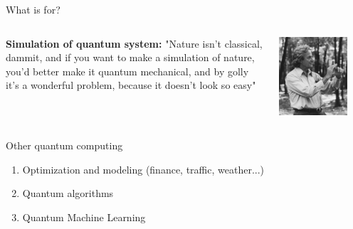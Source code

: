 \documentclass[aspectratio=169,10pt]{beamer}
\begin{document}
\begin{frame}{What is for?}
  \begin{columns}
    \begin{column}{0.5\textwidth}
        \textbf{Simulation of quantum system:} "Nature isn't classical, dammit, and if you want to make a simulation of nature, you'd better make it quantum mechanical, and by golly it's a wonderful problem, because it doesn't look so easy"
      \end{column}
      \begin{column}{0.5\textwidth}
        \begin{center}
            \includegraphics[width=0.8\textwidth]{figures/feynmann.jpg}
        \end{center}
      \end{column}
  \end{columns}
\end{frame}


\begin{frame}{Other quantum computing}
  \begin{enumerate}
    \item Optimization and modeling (finance, traffic, weather...)
    \item Quantum algorithms 
    \item Quantum Machine Learning
  \end{enumerate}
\end{frame}
\end{document}
